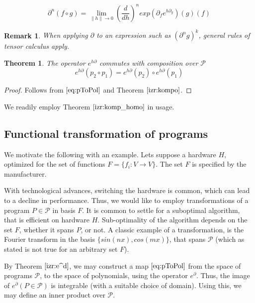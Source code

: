 \documentclass{article}
\newcommand{\dP}{\mathcal{P}}
\newcommand{\D}{\partial}
\newtheorem{izrek}{Theorem}[section]
\newtheorem{opomba}{Remark}[section]
\begin{document}
 \begin{equation}\label{eq:dkompo}
 \D^n(f\circ g)=\lim\limits_{\lVert h\rVert\to 0}(\frac{d}{dh})^nexp(\D_fe^{h\D_g})(g)(f)
 \end{equation}
 
 \begin{opomba}
 When applying $\D$ to an expression such as $(\D^n g)^k$, general rules of tensor calculus apply. 
 \end{opomba}
 
   \begin{izrek}\label{izr:komp_homo}
   The operator $e^{h\D}$ commutes with composition over $\dP$
   \begin{equation}
   e^{h\D}(p_2\circ p_1)=e^{h\D}(p_2)\circ e^{h\D}(p_1)
   \end{equation}
   \end{izrek}
   
   \begin{proof}
   Follows from $\eqref{eq:pToPol}$ and Theorem $\ref{izr:kompo}$.
   \end{proof}
 We readily employ Theorem $\ref{izr:komp_homo}$ in usage.
 
   \subsection{Functional transformation of programs}\label{sec:FTP}
   
   We motivate the following with an example. Lets suppose a hardware $H$, optimized for the set of functions $F=\{f_i:V\to V\}$. The set $F$ is specified by the manufacturer.
   
   With technological advances, switching the hardware is common, which can lead to a decline in performance. Thus, we would like to employ transformations of a program $P\in\dP$ in basis $F$. It is common to settle for a suboptimal algorithm, that is efficient on hardware $H$. Sub-optimality of the algorithm depends on the set $F$, whether it spans $P$, or not. A classic example of a transformation, is the Fourier transform in the basis $\{sin(nx), cos(mx)\}$, that spans $\dP$ (which as stated is not true for an arbitrary set $F$).
   
   By Theorem $\ref{izr:e^d}$, we may construct a map $\eqref{eq:pToPol}$ from the space of programs $\dP$, to the space of polynomials, using the operator $e^\D$. Thus, the image of $e^\D(P\in\dP)$ is integrable (with a suitable choice of domain). Using this, we may define an inner product over $\dP$.
   
\end{document}
